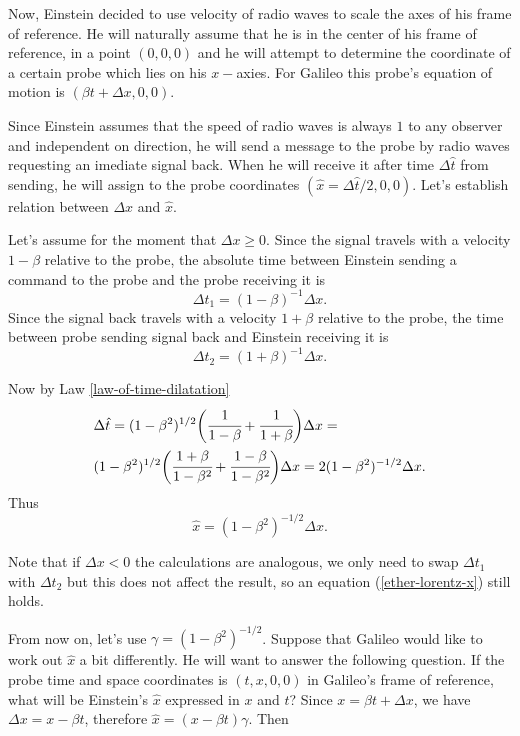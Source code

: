 \documentclass[main.tex]{subfiles}
\begin{document}
Now, Einstein decided to use velocity of radio waves to scale the axes of his frame of reference. He will naturally assume that he is in the center of his frame of reference, in a point $(0, 0, 0)$ and he will attempt to determine the coordinate of a certain probe which lies on his $x-$axies. For Galileo this probe's equation of motion is $(\beta t + \Delta x, 0, 0)$.

Since Einstein assumes that the speed of radio waves is always $1$ to any observer and independent on direction, he will send a message to the probe by radio waves requesting an imediate signal back. When he will receive it after time $\Delta \hat{t}$ from sending, he will assign to the probe coordinates $(\hat{x} = \Delta \hat{t}/2, 0, 0)$. Let's establish relation between $\Delta x$ and $\hat{x}$.

Let's assume for the moment that $\Delta x \geq 0$. Since the signal travels with a velocity $1 - \beta$ relative to the probe, the absolute time between Einstein sending a command to the probe and the probe receiving it is
\begin{equation}
\Delta t_1 = (1 - \beta)^{-1} \Delta x.
\end{equation}
Since the signal back travels with a velocity $1 + \beta$ relative to the probe, the time between probe sending signal back and Einstein receiving it is
\begin{equation}
\Delta t_2 = (1 + \beta)^{-1} \Delta x.
\end{equation}

Now by Law \ref{law-of-time-dilatation}
\begin{align*}
& \Delta \hat{t} = (1 - \beta^2)^{1/2}\bigg(\cfrac{1}{1 - \beta} + \cfrac{1}{1 + \beta} \bigg) \Delta x = \\
& (1 - \beta^2)^{1/2} \bigg(\cfrac{1 + \beta}{1 - \beta^2} + \cfrac{1 - \beta}{1 - \beta^2} \bigg) \Delta x = 2(1-\beta^2)^{-1/2} \Delta x.
\end{align*}
Thus
\begin{equation}
\label{ether-lorentz-x}
\hat{x} = (1-\beta^2)^{-1/2} \Delta x.
\end{equation}

Note that if $\Delta x < 0$ the calculations are analogous, we only need to swap $\Delta t_1$ with $\Delta t_2$ but this does not affect the result, so an equation (\ref{ether-lorentz-x}) still holds.

From now on, let's use $\gamma = (1-\beta^2)^{-1/2}$. Suppose that Galileo would like to work out $\hat{x}$ a bit differently. He will want to answer the following question. If the probe time and space coordinates is $(t, x, 0, 0)$ in Galileo's frame of reference, what will be Einstein's $\hat{x}$ expressed in $x$ and $t$? Since $x = \beta t + \Delta x$, we have $\Delta x = x - \beta t$, therefore $\hat{x} = (x - \beta t) \gamma$. Then
\end{document}
